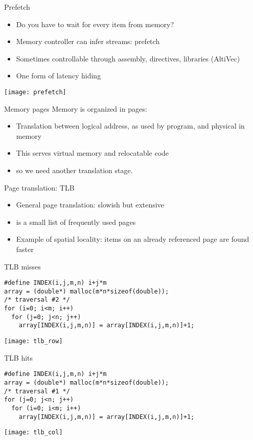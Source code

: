 \begin{frame}{Prefetch}
  \begin{itemize}
  \item Do you have to wait for every item from memory?
  \item Memory controller can infer streams: prefetch
  \item Sometimes controllable through assembly, directives, libraries (AltiVec)
  \item One form of latency hiding
  \end{itemize}
\texttt{[image: prefetch]}
\end{frame}

\begin{frame}{Memory pages}
  Memory is organized in pages:
  \begin{itemize}
  \item Translation between logical address, as used by program,
    and physical in memory
  \item This serves virtual memory and relocatable code
  \item so we need another translation stage.
  \end{itemize}
\end{frame}

\begin{frame}{Page translation: TLB}
  \begin{itemize}
  \item General page translation: slowish but extensive
  \item {} is a small list of frequently used pages
  \item Example of spatial locality: items on an already referenced page
    are found faster
  \end{itemize}
\end{frame}

\begin{frame}[fragile]{TLB misses}
\small
\begin{verbatim}
#define INDEX(i,j,m,n) i+j*m
array = (double*) malloc(m*n*sizeof(double));
/* traversal #2 */
for (i=0; i<m; i++)
  for (j=0; j<n; j++)
    array[INDEX(i,j,m,n)] = array[INDEX(i,j,m,n)]+1;
\end{verbatim}
  \texttt{[image: tlb\_row]}
\end{frame}

\begin{frame}[fragile]{TLB hits}
\small
\begin{verbatim}
#define INDEX(i,j,m,n) i+j*m
array = (double*) malloc(m*n*sizeof(double));
/* traversal #1 */
for (j=0; j<n; j++)
  for (i=0; i<m; i++)
    array[INDEX(i,j,m,n)] = array[INDEX(i,j,m,n)]+1;
\end{verbatim}
  \texttt{[image: tlb\_col]}
\end{frame}

